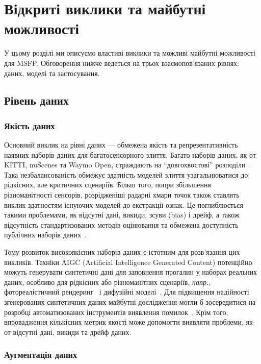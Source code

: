 \section{Відкриті виклики та майбутні можливості}
\label{s:open challenges}

У цьому розділі ми описуємо властиві виклики та можливі майбутні можливості для MSFP.
Обговорення нижче ведеться на трьох взаємопов'язаних рівнях: даних, моделі та застосування.


\subsection{Рівень даних}

\subsubsection{Якість даних}

Основний виклик на рівні даних — обмежена якість та репрезентативність наявних наборів даних для багатосенсорного злиття.
Багато наборів даних, як-от KITTI, nuScenes та Waymo Open, страждають на ``довгохвостові'' розподіли~\cite{geiger2012kitti, caesar2020nuscenes, sun2020waymo}.
Така незбалансованість обмежує здатність моделей злиття узагальнюватися до рідкісних, але критичних сценаріїв.
Більш того, попри збільшення різноманітності сенсорів, розрідженіші радарні хмари точок також ставлять виклик здатностям існуючих моделей до екстракції ознак. Це поглиблюється такими проблемами, як відсутні дані, викиди, зсуви (bias) і дрейф, а також відсутність стандартизованих методів оцінювання та обмежена доступність публічних наборів даних~\cite{teh2020sensor}.

Тому розвиток високоякісних наборів даних є істотним для розв'язання цих викликів.
Техніки AIGC (Artificial Intelligence Generated Content) потенційно можуть генерувати синтетичні дані для заповнення прогалин у наборах реальних даних, особливо для рідкісних або різноманітних сценаріїв, \textit{напр.}, фотореалістичний рендеринг~\cite{yangreal} і дифузійні моделі~\cite{croitoru2023diffusion}.
Для підвищення надійності згенерованих синтетичних даних майбутні дослідження могли б зосередитися на розробці автоматизованих інструментів виявлення помилок~\cite{ehrlinger2022survey}. Крім того, впровадження кількісних метрик якості може допомогти виявляти проблеми, як-от відсутні дані, викиди та дрейф даних.



\subsubsection{Аугментація даних}

